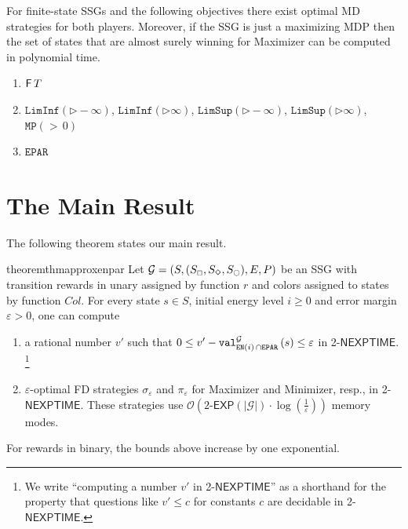 \documentclass[a4paper,UKenglish,cleveref,autoref,thm-restate]{lipics-v2021}
\newcommand{\Eparity}{\mathtt{EPAR}}
\newcommand{\LimInf}[2]{\mathtt{LimInf}(#1 #2)}
\newcommand{\LimSup}[2]{\mathtt{LimSup}(#1 #2)}
\newcommand{\MP}[2]{\mathtt{MP}(#1\, #2)}
\newcommand{\en}{\mathtt{EN}}
\newcommand{\+}[1]{\mathbb{#1}}
\newcommand{\?}[1]{\mathcal{#1}}
\newcommand{\Ocompl}{\?{O}}
\newcommand{\rsymbol}{\ocircle}
\newcommand{\zsymbol}{\Box}
\newcommand{\osymbol}{\Diamond}
\newcommand{\zstates}{\states_\zsymbol}
\newcommand{\rstates}{\states_\rsymbol}
\newcommand{\ostates}{\states_\osymbol}
\newcommand{\reachset}{T}
\newcommand{\abs}[1]{\lvert#1\rvert}
\newcommand{\size}[1]{\abs{#1}}
\newcommand{\eps}{\varepsilon}
\newcommand{\NEXPTIME}{\ensuremath{\mathsf{NEXPTIME}}}
\newcommand{\eventually}{{\sf F}}
\newcommand{\lrc}[1]{\left(#1\right)}
\newcommand{\tuple}[1]{\lrc{#1}}
\newcommand{\game}{{\mathcal G}}
\newcommand{\gametuple}{\tuple{\states,(\zstates,\ostates,\rstates),\transition,\probp}}
\newcommand{\states}{S}
\newcommand{\s}{s}
\newcommand{\transition}{{E}}
\newcommand{\probp}{P}
\newcommand{\zstrat}{\sigma}
\newcommand{\ostrat}{\pi}
\newcommand{\coloring}{{\mathit{C}ol}}
\begin{document}
\begin{remark}\label{rem:ssg-md}
For finite-state SSGs and the following objectives
there exist optimal MD strategies for both players.
Moreover, if the SSG is just a maximizing MDP then the set of states
that are almost surely winning for Maximizer can be computed in polynomial
time.
\begin{enumerate}
     \item $\eventually\,\reachset$ ~\cite{CONDON1992203}
     \item
       $\LimInf{\rhd}{-\infty}$,
       $\LimInf{\rhd}{\infty}$,
       $\LimSup{\rhd}{-\infty}$,
       $\LimSup{\rhd}{\infty}$,
       $\MP{>}{0}$ ~\cite[Prop.~1]{Brazdil2010}
     \item
       $\Eparity$ ~\cite{Zielonka:1998}
     \end{enumerate}
\end{remark}


\section{The Main Result}\label{sec:result}

The following theorem states our main result.

\begin{restatable}{theorem}{thmapproxenpar}\label{thm:approx_enpar}
  Let $\game = \gametuple$ be an SSG with transition rewards in unary
  assigned by function $r$ and colors assigned to states by function $\coloring$.
  For every state $\s \in \states$, initial energy level $i \ge 0$ and error margin
  $\eps > 0$, one can compute
  \begin{enumerate}
  \item
    a rational number $v'$ such that
    $0 \le v'-\valueof[\game][\en(i)\,\cap \Eparity]{\s} \le \eps$ in
    2-\NEXPTIME.
    \footnote{We write ``computing a number $v'$ in 2-\NEXPTIME'' as a shorthand for the
      property that questions like $v' \le c$ for constants $c$
      are decidable in 2-\NEXPTIME.} 
  \item
    $\eps$-optimal FD strategies $\zstrat_\eps$ and $\ostrat_\eps$ for Maximizer
    and Minimizer, resp., in 2-\NEXPTIME.
    These strategies use
    ${\Ocompl}\lrc{2\textrm{-}\mathsf{EXP}\lrc{\size{\game}} \cdot\log\lrc{\frac{1}{\eps}}}$
    memory modes.
  \end{enumerate}
  For rewards in binary, the bounds above increase by one exponential.
\end{restatable}
\end{document}
